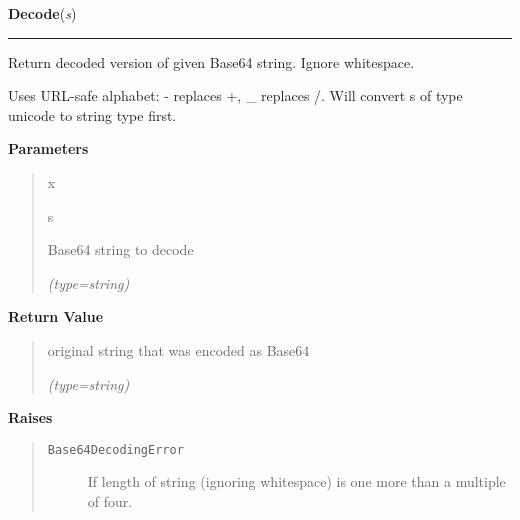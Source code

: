 \hspace{.8\funcindent}\begin{boxedminipage}{\funcwidth}

    \raggedright \textbf{Decode}(\textit{s})

    \vspace{-1.5ex}

    \rule{\textwidth}{0.5\fboxrule}
\setlength{\parskip}{2ex}
    Return decoded version of given Base64 string. Ignore whitespace.

    Uses URL-safe alphabet: - replaces +, \_ replaces /. Will convert s of 
    type unicode to string type first.

\setlength{\parskip}{1ex}
      \textbf{Parameters}
      \vspace{-1ex}

      \begin{quote}
        \begin{Ventry}{x}

          \item[s]

          Base64 string to decode

            {\it (type=string)}

        \end{Ventry}

      \end{quote}

      \textbf{Return Value}
    \vspace{-1ex}

      \begin{quote}
      original string that was encoded as Base64

      {\it (type=string)}

      \end{quote}

      \textbf{Raises}
    \vspace{-1ex}

      \begin{quote}
        \begin{description}

          \item[\texttt{Base64DecodingError}]

          If length of string (ignoring whitespace) is one more than a 
          multiple of four.

        \end{description}

      \end{quote}

    \end{boxedminipage}


